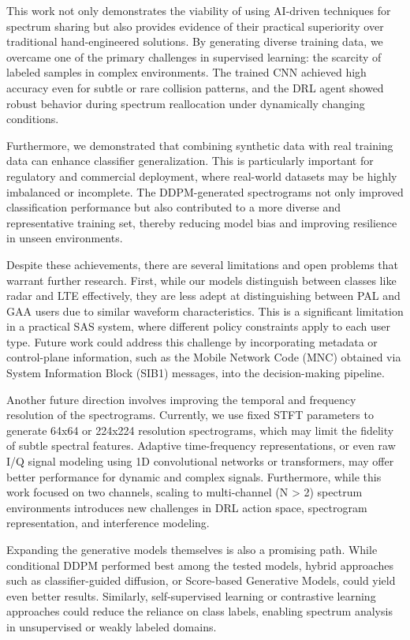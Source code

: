 This work not only demonstrates the viability of using AI-driven techniques for spectrum sharing but also provides evidence of their practical superiority over traditional hand-engineered solutions. By generating diverse training data, we overcame one of the primary challenges in supervised learning: the scarcity of labeled samples in complex environments. The trained CNN achieved high accuracy even for subtle or rare collision patterns, and the DRL agent showed robust behavior during spectrum reallocation under dynamically changing conditions.

Furthermore, we demonstrated that combining synthetic data with real training data can enhance classifier generalization. This is particularly important for regulatory and commercial deployment, where real-world datasets may be highly imbalanced or incomplete. The DDPM-generated spectrograms not only improved classification performance but also contributed to a more diverse and representative training set, thereby reducing model bias and improving resilience in unseen environments.

Despite these achievements, there are several limitations and open problems that warrant further research. First, while our models distinguish between classes like radar and LTE effectively, they are less adept at distinguishing between PAL and GAA users due to similar waveform characteristics. This is a significant limitation in a practical SAS system, where different policy constraints apply to each user type. Future work could address this challenge by incorporating metadata or control-plane information, such as the Mobile Network Code (MNC) obtained via System Information Block (SIB1) messages, into the decision-making pipeline.

Another future direction involves improving the temporal and frequency resolution of the spectrograms. Currently, we use fixed STFT parameters to generate 64x64 or 224x224 resolution spectrograms, which may limit the fidelity of subtle spectral features. Adaptive time-frequency representations, or even raw I/Q signal modeling using 1D convolutional networks or transformers, may offer better performance for dynamic and complex signals. Furthermore, while this work focused on two channels, scaling to multi-channel (N > 2) spectrum environments introduces new challenges in DRL action space, spectrogram representation, and interference modeling.

Expanding the generative models themselves is also a promising path. While conditional DDPM performed best among the tested models, hybrid approaches such as classifier-guided diffusion, or Score-based Generative Models, could yield even better results. Similarly, self-supervised learning or contrastive learning approaches could reduce the reliance on class labels, enabling spectrum analysis in unsupervised or weakly labeled domains.

